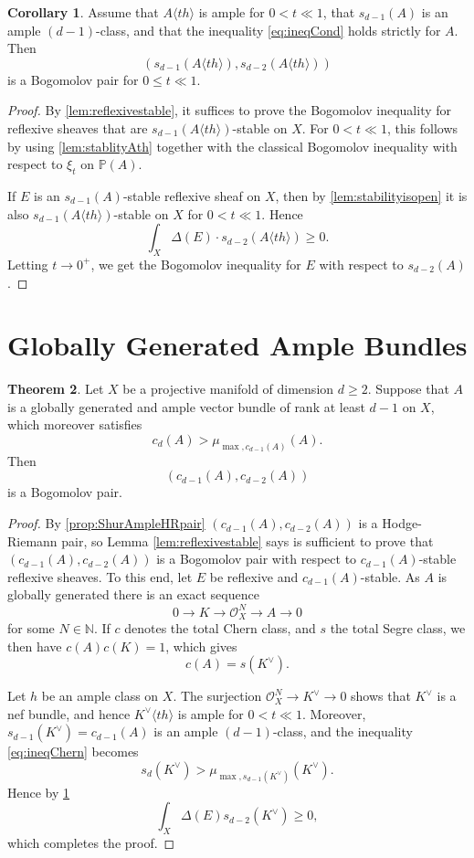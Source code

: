 \documentclass[a4,reqno]{amsart}
\theoremstyle{definition}
\newtheorem{theorem}{Theorem}[section]
\newtheorem{corollary}[theorem]{Corollary}
\renewcommand{\P}{\mathbb{P}}
\numberwithin{equation}{section}
\begin{document}
\begin{corollary}\label{cor:segrebogomolovpair}
Assume that $A\langle th\rangle$ is ample for $0 < t \ll 1$, that $s_{d-1}(A)$ is an ample $(d-1)$-class, and that the inequality \eqref{eq:ineqCond} holds strictly for $A$. Then $$(s_{d-1}(A\langle th\rangle),s_{d-2}(A\langle th\rangle))$$ is a Bogomolov pair for $0 \le t \ll 1$.
\end{corollary}
\begin{proof}
By \cref{lem:reflexivestable}, it suffices to prove the Bogomolov inequality for reflexive sheaves that are $s_{d-1}(A\langle th\rangle)$-stable on $X$. For $0 < t \ll 1$, this follows by using \cref{lem:stablityAth} together with the classical Bogomolov inequality with respect to $\xi_t$ on $\P(A)$.

If $E$ is an $s_{d-1}(A)$-stable reflexive sheaf on $X$, then by \cref{lem:stabilityisopen} it is also $s_{d-1}(A\langle th\rangle)$-stable on $X$ for $0 < t \ll 1$. Hence
\[
    \int_X \Delta(E) \cdot s_{d-2}(A\langle th\rangle) \ge 0.
\]
Letting $t \to 0^+$, we get the Bogomolov inequality for $E$ with respect to $s_{d-2}(A)$.
\end{proof}

\section{Globally Generated Ample Bundles}

\begin{theorem}\label{thm:globallygenerated_chern}
Let $X$ be a projective manifold of dimension $d\ge 2$.  Suppose that $A$ is a globally generated and ample vector bundle of rank at least $d-1$ on $X$, which moreover satisfies
\begin{equation}\label{eq:ineqChern}
     c_d(A) > \mu_{\max,c_{d-1}(A)}(A).
\end{equation}
Then
$$(c_{d-1}(A),c_{d-2}(A))$$
is a Bogomolov pair.
\end{theorem}

\begin{proof}
By \cref{prop:ShurAmpleHRpair} $(c_{d-1}(A),c_{d-2}(A))$ is a Hodge-Riemann pair, so Lemma \ref{lem:reflexivestable} says is sufficient to prove that $(c_{d-1}(A),c_{d-2}(A))$ is a Bogomolov pair with respect to $c_{d-1}(A)$-stable reflexive sheaves.   
To this end, let $E$ be reflexive and $c_{d-1}(A)$-stable.  As $A$ is globally generated there is an exact sequence
$$ 0 \to K \to \mathcal O_X^N \to A\to 0$$
for some $N\in \mathbb N$.  If $c$ denotes the total Chern class, and $s$ the total Segre class, we then have
$ c(A) c(K) = 1$, which gives
$$ c(A) = s(K^\vee).$$

Let $h$ be an ample class on $X$. The surjection $\mathcal O_X^N\to K^\vee\to 0$ shows that $K^\vee$ is a nef bundle, and hence $K^\vee\langle th\rangle$ is ample for $0<t\ll 1$. Moreover, $s_{d-1}(K^\vee) = c_{d-1}(A)$ is an ample $(d-1)$-class, and the inequality \eqref{eq:ineqChern} becomes
\[
    s_d(K^\vee) > \mu_{\max,s_{d-1}(K^\vee)}(K^\vee).
\]
Hence by  \cref{cor:segrebogomolovpair}
$$\int_X \Delta(E) s_{d-2}(K^\vee) \ge 0,$$
which completes the proof.
\end{proof}
\end{document}
